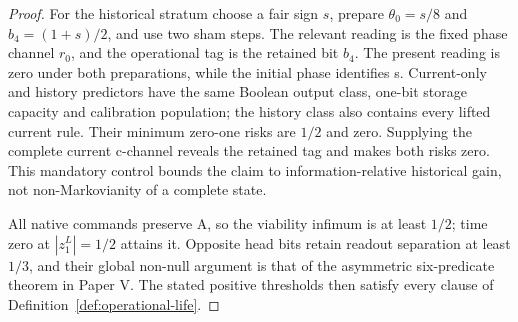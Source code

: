 \documentclass[11pt,a4paper]{article}
\theoremstyle{definition}
\begin{document}
\begin{proof}
For the historical stratum choose a fair sign $s$, prepare $\theta_0=s/8$
and $b_4=(1+s)/2$, and use two sham steps. The relevant reading is the fixed
phase channel $r_0$, and the operational tag is the retained bit $b_4$.
The present reading is zero under both preparations, while the initial phase
identifies s. Current-only and history predictors have the same Boolean output
class, one-bit storage capacity and calibration population; the history class
also contains every lifted current rule. Their minimum zero-one risks are
$1/2$ and zero. Supplying the complete current c-channel reveals the retained
tag and makes both risks zero. This mandatory control bounds the claim to
information-relative historical gain, not non-Markovianity of a complete state.

All native commands preserve A, so the viability infimum is at least $1/2$;
time zero at $|z_1^L|=1/2$ attains it. Opposite head bits retain readout
separation at least $1/3$, and their global non-null argument is that of the
asymmetric six-predicate theorem in Paper V. The stated positive thresholds
then satisfy every clause of Definition~\ref{def:operational-life}.
\end{proof}
\end{document}
